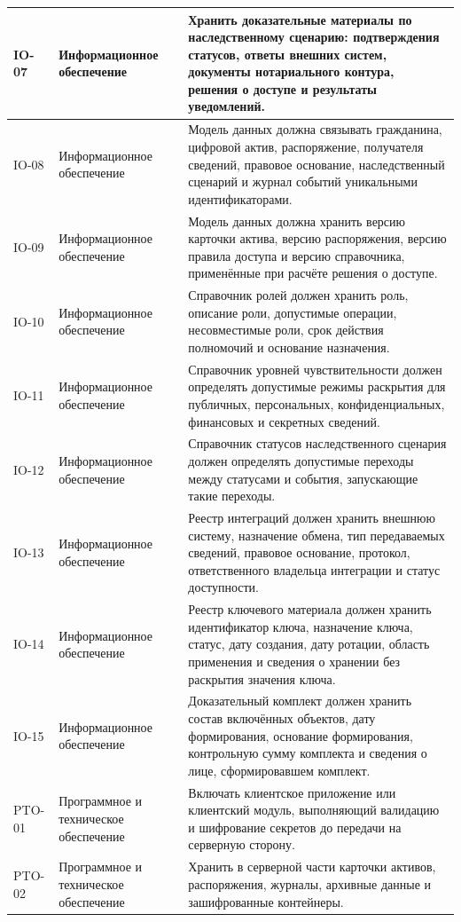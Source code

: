 \begin{longtable}{|P{1.45cm}|P{3.35cm}|P{10.7cm}|}
IO-07 & Информационное обеспечение & Хранить доказательные материалы по наследственному сценарию: подтверждения статусов, ответы внешних систем, документы нотариального контура, решения о доступе и результаты уведомлений.\\ \hline
IO-08 & Информационное обеспечение & Модель данных должна связывать гражданина, цифровой актив, распоряжение, получателя сведений, правовое основание, наследственный сценарий и журнал событий уникальными идентификаторами.\\ \hline
IO-09 & Информационное обеспечение & Модель данных должна хранить версию карточки актива, версию распоряжения, версию правила доступа и версию справочника, применённые при расчёте решения о доступе.\\ \hline
IO-10 & Информационное обеспечение & Справочник ролей должен хранить роль, описание роли, допустимые операции, несовместимые роли, срок действия полномочий и основание назначения.\\ \hline
IO-11 & Информационное обеспечение & Справочник уровней чувствительности должен определять допустимые режимы раскрытия для публичных, персональных, конфиденциальных, финансовых и секретных сведений.\\ \hline
IO-12 & Информационное обеспечение & Справочник статусов наследственного сценария должен определять допустимые переходы между статусами и события, запускающие такие переходы.\\ \hline
IO-13 & Информационное обеспечение & Реестр интеграций должен хранить внешнюю систему, назначение обмена, тип передаваемых сведений, правовое основание, протокол, ответственного владельца интеграции и статус доступности.\\ \hline
IO-14 & Информационное обеспечение & Реестр ключевого материала должен хранить идентификатор ключа, назначение ключа, статус, дату создания, дату ротации, область применения и сведения о хранении без раскрытия значения ключа.\\ \hline
IO-15 & Информационное обеспечение & Доказательный комплект должен хранить состав включённых объектов, дату формирования, основание формирования, контрольную сумму комплекта и сведения о лице, сформировавшем комплект.\\ \hline
PTO-01 & Программное и техническое обеспечение & Включать клиентское приложение или клиентский модуль, выполняющий валидацию и шифрование секретов до передачи на серверную сторону.\\ \hline
PTO-02 & Программное и техническое обеспечение & Хранить в серверной части карточки активов, распоряжения, журналы, архивные данные и зашифрованные контейнеры.\\ \hline

\end{longtable}
